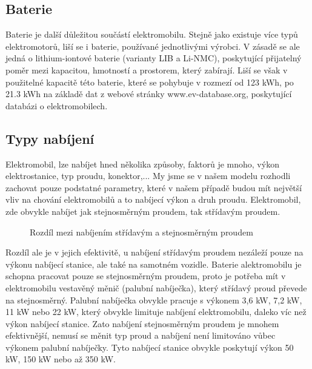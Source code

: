\documentclass[a4paper,11pt]{article}
\begin{document}
\subsection{Baterie}
Baterie je další důležitou součástí elektromobilu. Stejně jako existuje více typů elektromotorů, 
liší se i baterie, používané jednotlivými výrobci. V zásadě se ale jedná o lithium-iontové baterie
(varianty LIB a Li-NMC), poskytující přijatelný poměr mezi kapacitou, hmotností a prostorem, který 
zabírají.\cite{baterie_ev_wiki} Liší se však v použitelné kapacitě této baterie, které se pohybuje 
v rozmezí od 123 kWh, po 21.3 kWh na základě dat z webové stránky www.ev-database.org\cite{ev_database}, 
poskytující databázi o elektromobilech.

\subsection{Typy nabíjení}
Elektromobil, lze nabíjet hned několika způsoby, faktorů je mnoho, výkon elektrostanice, typ proudu, konektor,...
My jsme se v našem modelu rozhodli zachovat pouze podstatné parametry, které v našem případě budou mít největší 
vliv na chování elektromobilů a to nabíjecí výkon a druh proudu. Elektromobil, zde obvykle nabíjet jak 
stejnosměrným proudem, tak střídavým proudem.

\begin{figure}[H]
    \centering
    \caption{Rozdíl mezi nabíjením střídavým a stejnosměrným proudem \cite{rozdil_mezi_ac_dc_nabijenim}}
    \label{figure:difference-between-ac-and-cd-charging-ev}
\end{figure}

Rozdíl ale je v jejich efektivitě, u nabíjení střídavým proudem nezáleží pouze na výkonu nabíjecí stanice, 
ale také na samotném vozidle. Baterie alektromobilu je schopna pracovat pouze se stejnosměrným proudem, 
proto je potřeba mít v elektromobilu vestavěný měnič (palubní nabíječka), který střídavý proud převede 
na stejnosměrný. Palubní nabíječka obvykle pracuje s výkonem 3,6 kW, 7,2 kW, 11 kW nebo 22 kW,
který obvykle limituje nabíjení elektromobilu, daleko víc než výkon nabíjecí stanice. \cite{nabijeni_ev}
Zato nabíjení stejnosměrným proudem je mnohem efektivnější, nemusí se měnit typ proud a nabíjení není limitováno
vůbec výkonem palubní nabíječky. Tyto nabíjecí stanice obvykle poskytují výkon 50 kW, 150 kW nebo až 350 kW.\cite{nabijeni_ev, data_brno}
\end{document}
